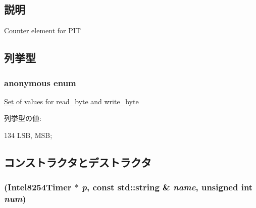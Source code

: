 \subsection{説明}
\hyperlink{classIntel8254Timer_1_1Counter}{Counter} element for PIT 

\subsection{列挙型}
\hypertarget{classIntel8254Timer_1_1Counter_ae6dceca96ec2c7a1b4aa211264a87ef6}{
\subsubsection[{"@58}]{\setlength{\rightskip}{0pt plus 5cm}anonymous enum}}
\label{classIntel8254Timer_1_1Counter_ae6dceca96ec2c7a1b4aa211264a87ef6}
\hyperlink{classSet}{Set} of values for read\_\-byte and write\_\-byte \begin{Desc}
\item[列挙型の値: ]\par
\begin{description}
\item[{\em 
\hypertarget{classIntel8254Timer_1_1Counter_ae6dceca96ec2c7a1b4aa211264a87ef6ac8bd62065abff19ea8ce3ec18cf3d6fe}{
LSB}
\label{classIntel8254Timer_1_1Counter_ae6dceca96ec2c7a1b4aa211264a87ef6ac8bd62065abff19ea8ce3ec18cf3d6fe}
}]\item[{\em 
\hypertarget{classIntel8254Timer_1_1Counter_ae6dceca96ec2c7a1b4aa211264a87ef6aaf93e41af4961a7cd6042752d7ee66f8}{
MSB}
\label{classIntel8254Timer_1_1Counter_ae6dceca96ec2c7a1b4aa211264a87ef6aaf93e41af4961a7cd6042752d7ee66f8}
}]\end{description}
\end{Desc}




\begin{DoxyCode}
134 {LSB, MSB};
\end{DoxyCode}


\subsection{コンストラクタとデストラクタ}
\hypertarget{classIntel8254Timer_1_1Counter_a5fe920d0924fff4ed3a2de514f66c579}{
\subsubsection[{Counter}]{ ({\bf Intel8254Timer} $\ast$ {\em p}, \/  const std::string \& {\em name}, \/  unsigned int {\em num})}}
\label{classIntel8254Timer_1_1Counter_a5fe920d0924fff4ed3a2de514f66c579}


